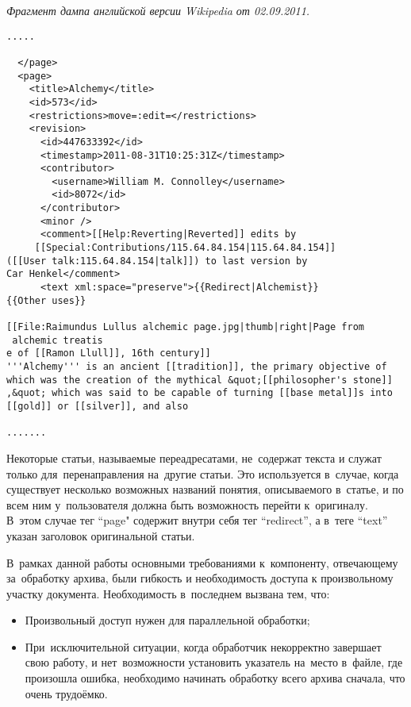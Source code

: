 \begin{center}
\textit{Фрагмент дампа английской версии Wikipedia от 02.09.2011.}
\end{center}
\begin{verbatim}
.....

  </page>
  <page>
    <title>Alchemy</title>
    <id>573</id>
    <restrictions>move=:edit=</restrictions>
    <revision>
      <id>447633392</id>
      <timestamp>2011-08-31T10:25:31Z</timestamp>
      <contributor>
        <username>William M. Connolley</username>
        <id>8072</id>
      </contributor>
      <minor />
      <comment>[[Help:Reverting|Reverted]] edits by
	 [[Special:Contributions/115.64.84.154|115.64.84.154]] 
([[User talk:115.64.84.154|talk]]) to last version by 
Car Henkel</comment>
      <text xml:space="preserve">{{Redirect|Alchemist}}
{{Other uses}}

[[File:Raimundus Lullus alchemic page.jpg|thumb|right|Page from
 alchemic treatis
e of [[Ramon Llull]], 16th century]]
'''Alchemy''' is an ancient [[tradition]], the primary objective of 
which was the creation of the mythical &quot;[[philosopher's stone]]
,&quot; which was said to be capable of turning [[base metal]]s into 
[[gold]] or [[silver]], and also

.......
\end{verbatim}

Некоторые статьи, называемые переадресатами, не~содержат текста и служат только для~перенаправления на~другие статьи. 
Это используется в~случае, когда существует несколько возможных названий понятия, 
описываемого в~статье, и по всем ним у~пользователя должна быть возможность перейти к~оригиналу.
В~этом случае тег ``page" содержит внутри себя тег ``redirect'', 
а в~теге ``text'' указан заголовок оригинальной статьи.

В~рамках данной работы основными требованиями к~компоненту, 
отвечающему за~обработку архива, были гибкость и необходимость доступа к произвольному участку документа.
Необходимость в~последнем вызвана тем, что:

\begin{itemize}

\item{
Произвольный доступ нужен для параллельной обработки;
}

\item{
При~исключительной ситуации, когда  обработчик некорректно завершает свою работу, 
и нет~возможности установить указатель на~место в~файле, где произошла ошибка,
необходимо начинать обработку всего архива сначала, что очень трудоёмко.
}

\end{itemize}

